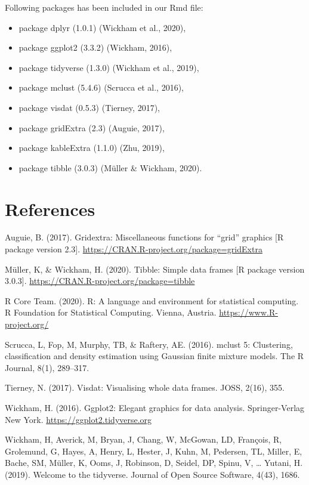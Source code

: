 \documentclass[11pt,a4paper,]{article}
\providecommand{\tightlist}{%
  \setlength{\itemsep}{0pt}\setlength{\parskip}{0pt}}
\begin{document}
Following packages has been included in our Rmd file:

\begin{itemize}
\tightlist
\item
  package dplyr (1.0.1) (Wickham et al., 2020),
\item
  package ggplot2 (3.3.2) (Wickham, 2016),
\item
  package tidyverse (1.3.0) (Wickham et al., 2019),
\item
  package mclust (5.4.6) (Scrucca et al., 2016),
\item
  package visdat (0.5.3) (Tierney, 2017),
\item
  package gridExtra (2.3) (Auguie, 2017),
\item
  package kableExtra (1.1.0) (Zhu, 2019),
\item
  package tibble (3.0.3) (Müller \& Wickham, 2020).
\end{itemize}

\clearpage

\hypertarget{references}{%
\section{References}\label{references}}

Auguie, B. (2017). Gridextra: Miscellaneous functions for ``grid'' graphics {[}R package version 2.3{]}.
\url{https://CRAN.R-project.org/package=gridExtra}

Müller, K, \& Wickham, H. (2020). Tibble: Simple data frames {[}R package version 3.0.3{]}. \url{https://CRAN.R-project.org/package=tibble}

R Core Team. (2020). R: A language and environment for statistical computing. R Foundation for Statistical Computing. Vienna, Austria. \url{https://www.R-project.org/}

Scrucca, L, Fop, M, Murphy, TB, \& Raftery, AE. (2016). mclust 5: Clustering, classification and density
estimation using Gaussian finite mixture models. The R Journal, 8(1), 289--317.

Tierney, N. (2017). Visdat: Visualising whole data frames. JOSS, 2(16), 355.

Wickham, H. (2016). Ggplot2: Elegant graphics for data analysis. Springer-Verlag New York. \url{https://ggplot2.tidyverse.org}

Wickham, H, Averick, M, Bryan, J, Chang, W, McGowan, LD, François, R, Grolemund, G, Hayes, A,
Henry, L, Hester, J, Kuhn, M, Pedersen, TL, Miller, E, Bache, SM, Müller, K, Ooms, J, Robinson,
D, Seidel, DP, Spinu, V, \ldots{} Yutani, H. (2019). Welcome to the tidyverse. Journal of Open
Source Software, 4(43), 1686.
\end{document}
